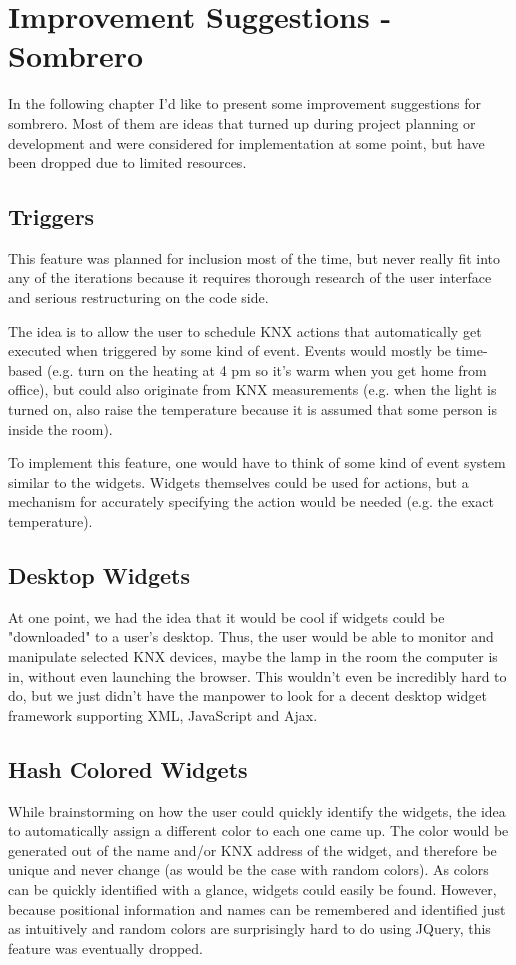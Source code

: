 \section{Improvement Suggestions - Sombrero}
In the following chapter I'd like to present some improvement suggestions for sombrero. Most of them are ideas that turned up during project planning or development and were considered for implementation at some point, but have been dropped due to limited resources.

\subsection{Triggers}
This feature was planned for inclusion most of the time, but never really fit into any of the iterations because it requires thorough research of the user interface and serious restructuring on the code side.

The idea is to allow the user to schedule KNX actions that automatically get executed when triggered by some kind of event. Events would mostly be time-based (e.g. turn on the heating at 4 pm so it's warm when you get home from office), but could also originate from KNX measurements (e.g. when the light is turned on, also raise the temperature because it is assumed that some person is inside the room).

To implement this feature, one would have to think of some kind of event system similar to the widgets. Widgets themselves could be used for actions, but a mechanism for accurately specifying the action would be needed (e.g. the exact temperature).


\subsection{Desktop Widgets}
At one point, we had the idea that it would be cool if widgets could be "downloaded" to a user's desktop. Thus, the user would be able to monitor and manipulate selected KNX devices, maybe the lamp in the room the computer is in, without even launching the browser. This wouldn't even be incredibly hard to do, but we just didn't have the manpower to look for a decent desktop widget framework supporting XML, JavaScript and Ajax.


\subsection{Hash Colored Widgets}
While brainstorming on how the user could quickly identify the widgets, the idea to automatically assign a different color to each one came up. The color would be generated out of the name and/or KNX address of the widget, and therefore be unique and never change (as would be the case with random colors). As colors can be quickly identified with a glance, widgets could easily be found. However, because positional information and names can be remembered and identified just as intuitively and random colors are surprisingly hard to do using JQuery, this feature was eventually dropped.


